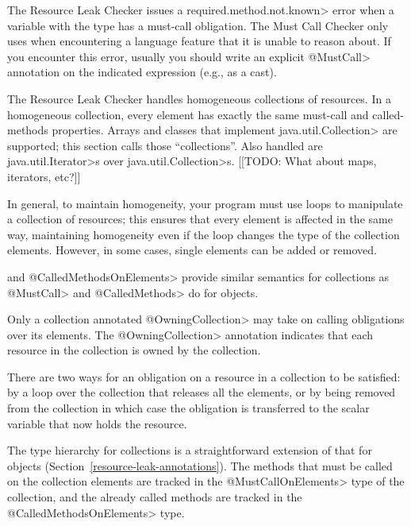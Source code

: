 The Resource Leak Checker issues a \<required.method.not.known> error
when a variable with the type \MustCallUnknown has a must-call obligation.
The Must Call Checker
only uses \MustCallUnknown when encountering a language
feature that it is unable to reason about.
If you encounter this error, usually you should write an explicit \<@MustCall> annotation
on the indicated expression (e.g., as a cast).



The Resource Leak Checker handles homogeneous collections of resources. In a homogeneous collection, every element
has exactly the same must-call and called-methods properties. Arrays and
classes that implement \<java.util.Collection> are supported; this section
calls those ``collections''. Also handled are \<java.util.Iterator>s over \<java.util.Collection>s.
[[TODO: What about maps, iterators, etc?]]

In general, to maintain homogeneity, your program must use loops to
manipulate a collection of resources; this ensures that every element is
affected in the same way, maintaining homogeneity even if the loop changes
the type of the collection elements.  However, in some cases, single elements can
be added or removed.


\MustCallOnElements and \<@CalledMethodsOnElements> provide similar semantics for collections as \<@MustCall> and \<@CalledMethods> do for objects.

Only a collection annotated \<@OwningCollection> may take on calling
obligations over its elements.  The \<@OwningCollection> annotation
indicates that each resource in the collection is owned by the collection.

There are two ways for an obligation on a resource in a collection to be
satisfied:  by a loop over the collection that releases all the elements,
or by being removed from the collection in which case the obligation is
transferred to the scalar variable that now holds the resource.

The type hierarchy for collections is a straightforward extension of that
for objects (Section~\ref{resource-leak-annotations}).
The methods that must be called on the collection elements are tracked in
the \<@MustCallOnElements> type of the collection, and the already called
methods are tracked in the \<@CalledMethodsOnElements> type.

